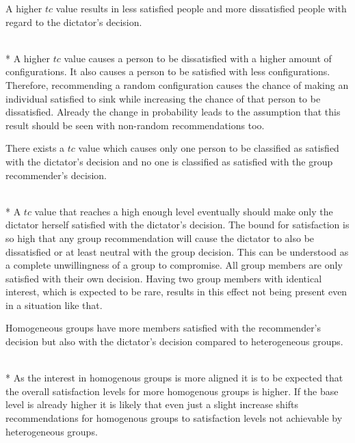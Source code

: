 \begin{hypothesis}
    \begin{itshape}
        \label{hyp:Evaluation:HigherTcLessSatisfied} A higher $tc$ value results in less satisfied people and more dissatisfied people with regard to the dictator's decision.
    \end{itshape} \medskip \\*
    A higher $tc$ value causes a person to be dissatisfied with a higher amount of configurations. It also causes a person to be satisfied with less configurations. Therefore, recommending a random configuration causes the chance of making an individual satisfied to sink while increasing the chance of that person to be dissatisfied. Already the change in probability leads to the assumption that this result should be seen with non-random recommendations too.
\end{hypothesis}

\begin{hypothesis}
    \begin{itshape}
        \label{hyp:Evaluation:OnlyOneSatisfied} There exists a $tc$ value which causes only one person to be classified as satisfied with the dictator's decision and no one is classified as satisfied with the group recommender's decision.
    \end{itshape} \medskip \\*
    A $tc$ value that reaches a high enough level eventually should make only the dictator herself satisfied with the dictator's decision. The bound for satisfaction is so high that any group recommendation will cause the dictator to also be dissatisfied or at least neutral with the group decision. This can be understood as a complete unwillingness of a group to compromise. All group members are only satisfied with their own decision. Having two group members with identical interest, which is expected to be rare, results in this effect not being present even in a situation like that. 
\end{hypothesis}

\begin{hypothesis}
    \begin{itshape}
        \label{hyp:Evaluation:HomogenousMoreSatisfied} Homogeneous groups have more members satisfied with the recommender's decision but also with the dictator's decision compared to heterogeneous groups.
    \end{itshape} \medskip \\*
    As the interest in homogenous groups is more aligned it is to be expected that the overall satisfaction levels for more homogenous groups is higher. If the base level is already higher it is likely that even just a slight increase shifts recommendations for homogenous groups to satisfaction levels not achievable by heterogeneous groups.
\end{hypothesis}

